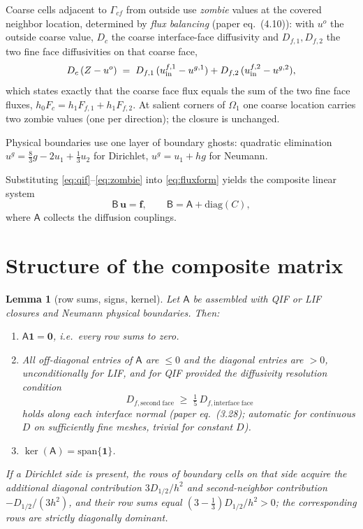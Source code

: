 \documentclass[11pt]{article}
\newtheorem{lemma}[theorem]{Lemma}
\theoremstyle{remark}
\begin{document}
Coarse cells adjacent to $\Gamma_{cf}$ from outside use \emph{zombie}
values at the covered neighbor location, determined by \emph{flux
balancing} (paper eq.~(4.10)): with $u^{o}$ the outside coarse value,
$D_c$ the coarse interface-face diffusivity and $D_{f,1},D_{f,2}$ the
two fine face diffusivities on that coarse face,
\begin{equation}\label{eq:zombie}
  D_c\,(Z-u^{o}) \;=\; D_{f,1}\,(u^{f,1}_{\rm in}-u^{g,1})
                   + D_{f,2}\,(u^{f,2}_{\rm in}-u^{g,2}),
\end{equation}
which states exactly that the coarse face flux equals the sum of the two
fine face fluxes, $h_0F_c=h_1F_{f,1}+h_1F_{f,2}$.  At salient corners of
$\Omega_1$ one coarse location carries two zombie values (one per
direction); the closure is unchanged.

Physical boundaries use one layer of boundary ghosts: quadratic
elimination $u^{g}=\tfrac83 g-2u_1+\tfrac13u_2$ for Dirichlet,
$u^{g}=u_1+hg$ for Neumann.

Substituting \eqref{eq:qif}--\eqref{eq:zombie} into \eqref{eq:fluxform}
yields the composite linear system
\begin{equation}\label{eq:system}
  \mathsf{B}\,\mathbf{u} = \mathbf{f},\qquad
  \mathsf{B} = \mathsf{A} + \mathrm{diag}(C),
\end{equation}
where $\mathsf A$ collects the diffusion couplings.

\section{Structure of the composite matrix}

\begin{lemma}[row sums, signs, kernel]\label{lem:structure}
Let $\mathsf A$ be assembled with QIF or LIF closures and Neumann
physical boundaries.  Then:
\begin{enumerate}
\item[(i)] $\mathsf A\mathbf 1=\mathbf 0$, i.e.\ every row sums to zero.
\item[(ii)] All off-diagonal entries of $\mathsf A$ are $\le 0$ and the
diagonal entries are $>0$, unconditionally for LIF, and for QIF provided
the \emph{diffusivity resolution condition}
\begin{equation}\label{eq:res}
  D_{f,\mathrm{second\;face}} \;\ge\; \tfrac15\,
  D_{f,\mathrm{interface\;face}}
\end{equation}
holds along each interface normal (paper eq.~(3.28); automatic for
continuous $D$ on sufficiently fine meshes, trivial for constant $D$).
\item[(iii)] $\ker(\mathsf A)=\mathrm{span}\{\mathbf 1\}$.
\end{enumerate}
If a Dirichlet side is present, the rows of boundary cells on that side
acquire the additional diagonal contribution $3D_{1/2}/h^2$ and
second-neighbor contribution $-D_{1/2}/(3h^2)$, and their row sums equal
$(3-\tfrac13)D_{1/2}/h^2>0$; the corresponding rows are strictly
diagonally dominant.
\end{lemma}
\end{document}
